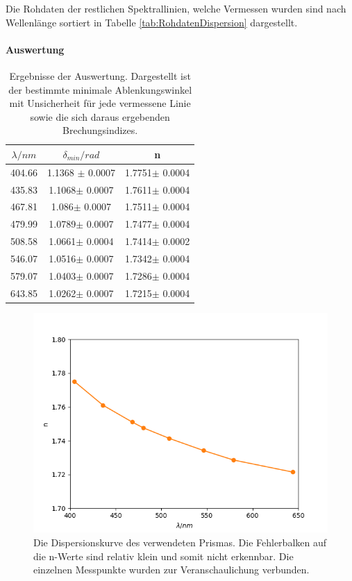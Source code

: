 \documentclass[12pt,a4paper]{article}
\begin{document}
Die Rohdaten der restlichen Spektrallinien, welche Vermessen wurden sind nach Wellenlänge sortiert in Tabelle \ref{tab:RohdatenDispersion} dargestellt.


\paragraph{Auswertung}

\begin{table}
\begin{center}
\begin{tabular}{|c|c|c|}
\hline
$\lambda /nm$ & $\delta_{min} / rad$ & n \\
\hline
404.66 & 1.1368 $\pm$ 0.0007 & 1.7751$\pm$ 0.0004\\
\hline
435.83 & 1.1068$\pm$ 0.0007 & 1.7611$\pm$ 0.0004\\
\hline
467.81 & 1.086$\pm$ 0.0007 & 1.7511$\pm$ 0.0004\\
\hline
479.99 & 1.0789$\pm$ 0.0007&1.7477$\pm$ 0.0004\\
\hline
508.58 & 1.0661$\pm$ 0.0004 & 1.7414$\pm$ 0.0002\\
\hline
546.07 & 1.0516$\pm$ 0.0007 & 1.7342$\pm$ 0.0004\\
\hline
579.07 & 1.0403$\pm$ 0.0007 & 1.7286$\pm$ 0.0004\\
\hline
643.85 & 1.0262$\pm$ 0.0007 & 1.7215$\pm$ 0.0004\\
\hline
\end{tabular}
\caption{Ergebnisse der Auswertung. Dargestellt ist der bestimmte minimale Ablenkungswinkel mit Unsicherheit für jede vermessene Linie sowie die sich daraus ergebenden Brechungsindizes.}
\label{tab:AuswertungDispersion}
\end{center}
\end{table}

\begin{figure}
\includegraphics[scale=1.0]{Bilder/Dispersionskurve.png}
\caption{Die Dispersionskurve des verwendeten Prismas. Die Fehlerbalken auf die n-Werte sind relativ klein und somit nicht erkennbar. Die einzelnen Messpunkte wurden zur Veranschaulichung verbunden.}\label{fig:Dispersionskurve}
\end{figure}
\end{document}
